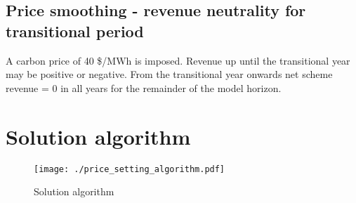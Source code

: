 \documentclass{article}
\begin{document}
\subsection{Price smoothing - revenue neutrality for transitional period}
A carbon price of 40 \$/MWh is imposed. Revenue up until the transitional year may be positive or negative. From the transitional year onwards net scheme revenue = 0 in all years for the remainder of the model horizon.

\section{Solution algorithm}

\begin{figure}
	\centering
	\texttt{[image: ./price\_setting\_algorithm.pdf]}
	\caption{Solution algorithm}
\end{figure}
\end{document}
